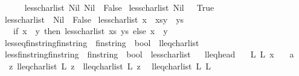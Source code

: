 \begin{isabellebody}
\ \ \ \isanewline
\ \ {\isachardoublequoteopen}less{\isacharunderscore}charlist\ Nil\ Nil\ {\isacharequal}\ False{\isachardoublequoteclose}\isanewline
{\isacharbar}\ {\isachardoublequoteopen}less{\isacharunderscore}charlist\ Nil\ {\isacharunderscore}\ {\isacharequal}\ True{\isachardoublequoteclose}\isanewline
{\isacharbar}\ {\isachardoublequoteopen}less{\isacharunderscore}charlist\ {\isacharunderscore}\ Nil\ {\isacharequal}\ False{\isachardoublequoteclose}\isanewline
{\isacharbar}\ {\isachardoublequoteopen}less{\isacharunderscore}charlist\ {\isacharparenleft}x\ {\isacharhash}\ xs{\isacharparenright}{\isacharparenleft}y\ {\isacharhash}\ ys{\isacharparenright}\ {\isacharequal}\ \isanewline
\ \ \ {\isacharparenleft}if\ x\ {\isacharequal}\ y\ then\ less{\isacharunderscore}charlist\ xs\ ys\ else\ x\ {\isacharless}\ y{\isacharparenright}{\isachardoublequoteclose}\isanewline
\isanewline
{}\isamarkupfalse%
\ less{\isacharunderscore}eq{\isacharunderscore}fin{\isacharunderscore}string{\isacharcolon}{\isacharcolon}{\isachardoublequoteopen}fin{\isacharunderscore}string\ {\isasymRightarrow}\ fin{\isacharunderscore}string\ {\isasymRightarrow}\ bool{\isachardoublequoteclose}\ \ lleq{\isacharunderscore}charlist%
\isadelimproof
\ %
\endisadelimproof
%
\isatagproof
{}\isamarkupfalse%
%
\endisatagproof
{\isafoldproof}%
%
\isadelimproof
%
\endisadelimproof
\isanewline
{}\isamarkupfalse%
\ less{\isacharunderscore}fin{\isacharunderscore}string{\isacharcolon}{\isacharcolon}{\isachardoublequoteopen}fin{\isacharunderscore}string\ {\isasymRightarrow}\ fin{\isacharunderscore}string\ {\isasymRightarrow}\ bool{\isachardoublequoteclose}\ \ less{\isacharunderscore}charlist%
\isadelimproof
\ %
\endisadelimproof
%
\isatagproof
{}\isamarkupfalse%
%
\endisatagproof
{\isafoldproof}%
%
\isadelimproof
%
\endisadelimproof
\isanewline
\isanewline
{}\isamarkupfalse%
\ lleq{\isacharunderscore}head{\isacharcolon}\isanewline
\ \ \ L{}\ L{}\ x\isanewline
\ \ \ a{\isacharcolon}\isanewline
\ \ {\isachardoublequoteopen}{\isacharparenleft}{\isasymAnd}z{\isachardot}\ lleq{\isacharunderscore}charlist\ L{}\ z\ {\isasymLongrightarrow}\ lleq{\isacharunderscore}charlist\ L{}\ z{\isacharparenright}{\isachardoublequoteclose}\isanewline
\ \ {\isachardoublequoteopen}lleq{\isacharunderscore}charlist\ L{}\ L{}{\isachardoublequoteclose}\isanewline

\end{isabellebody}
